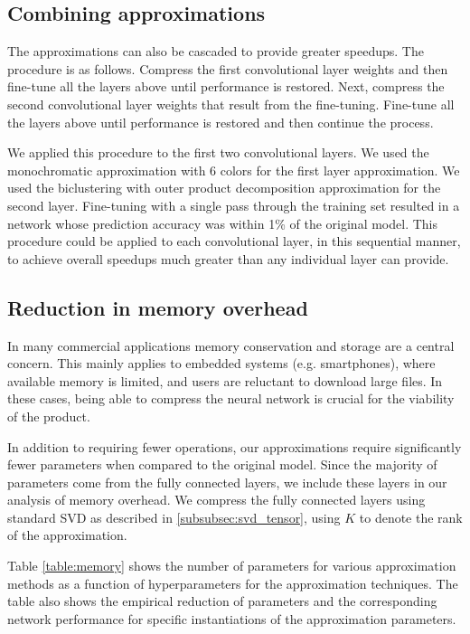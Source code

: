 \subsection{Combining approximations}
The approximations can also be cascaded to provide greater speedups.
The procedure is as follows. 
Compress the first convolutional layer weights and then 
fine-tune all the layers above until performance is restored. 
Next, compress the second convolutional layer weights that result from the fine-tuning.
Fine-tune all the layers above until performance is restored and then continue the process. 

We applied this procedure to the first two convolutional layers. 
We used the monochromatic approximation with 6 colors for the first layer approximation. 
We used the biclustering with outer product decomposition approximation for the second layer. 
Fine-tuning with a single pass through the training set resulted in a network whose prediction accuracy was within 1\% of the original model.
This procedure could be applied to each convolutional layer, in this sequential manner, to achieve overall speedups much greater than any individual layer can provide. 

\subsection{Reduction in memory overhead}
In many commercial applications memory conservation and storage are a
central concern. This mainly applies to embedded systems
(e.g. smartphones), where available memory is limited, and users are
reluctant to download large files. In these cases, being able to
compress the neural network is crucial for the viability of the
product. 

In addition to requiring fewer operations, our approximations
require significantly fewer parameters when compared to the original
model. 
Since the majority of parameters come from the fully connected layers, we include these layers in our analysis of memory overhead. 
We compress the fully connected layers using standard SVD as described in \ref{subsubsec:svd_tensor}, using $K$ to denote the rank of the approximation.
 
Table \ref{table:memory} shows the number of parameters for
various approximation methods as a function of hyperparameters for the approximation techniques.
The table also shows the empirical reduction of parameters and the corresponding network performance for specific instantiations of the approximation parameters.

